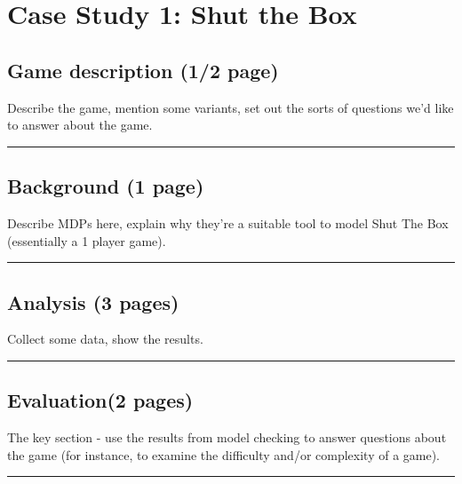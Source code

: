 \chapter{Case Study 1: Shut the Box}


\section{Game description (1/2 page)}
Describe the game, mention some variants, set out the sorts of questions we'd like to answer about the game.

\hrule

\blindtext

\blindtext

\blindtext

\section{Background (1 page)}

Describe MDPs here, explain why they're a suitable tool to model Shut The Box (essentially a 1 player game).

\hrule

\Blindtext

\section{Analysis (3 pages)}

Collect some data, show the results.

\hrule

\Blindtext

\Blindtext

\Blindtext

\section{Evaluation(2 pages)}

The key section - use the results from model checking to answer questions about the game (for instance, to examine the difficulty and/or complexity of a game).

\hrule

\Blindtext

\Blindtext